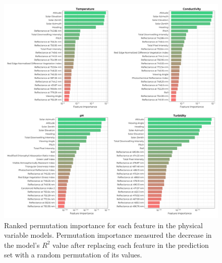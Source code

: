 \documentclass[remotesensing,article,accept,pdftex,moreauthors]{Definitions/mdpi}
\begin{document}
\begin{figure}[H]

\vspace{-0.15in}
\hspace{-6pt}\includegraphics[width=\columnwidth]{figures/results/fits/physical-ranking.pdf}
\vspace{-0.1in}
\caption{Ranked permutation importance for each feature in the physical variable models. Permutation importance measured the decrease in the model's $R^2$ value after replacing each feature in the prediction set with a random permutation of its values.\label{fig:physical-fi}}
\end{figure}  
\end{document}
